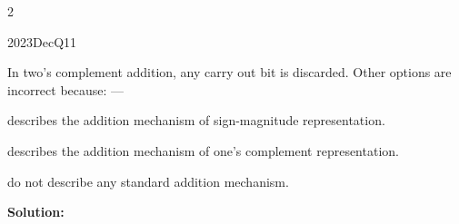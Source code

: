 \begin{multicols}{2}
\begin{qsolution}{2023}{Dec}{Q11}{\tgCE \tgCETwosComplement}

    In two's complement addition, any carry out bit is discarded.
    Other options are incorrect because: ---
    \begin{enumualpha}
        \item describes the addition mechanism of sign-magnitude representation.
        \item[(C)] describes the addition mechanism of one's complement representation.
        \item[(B), (D)] do not describe any standard addition mechanism.
    \end{enumualpha}
\end{qsolution}


\textbf{Solution:}


\end{multicols}
